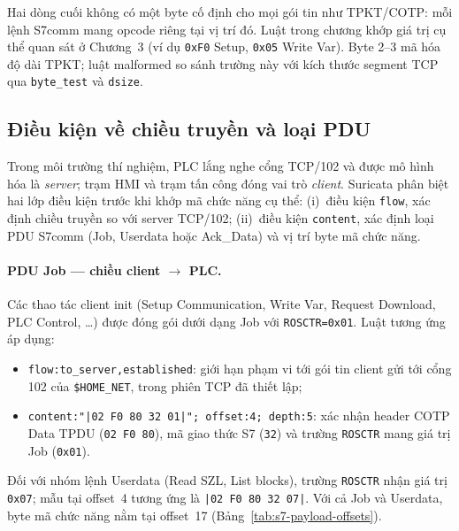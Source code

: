 \documentclass[../main.tex]{subfiles}
\begin{document}
Hai dòng cuối không có một byte cố định cho mọi gói tin như TPKT/COTP: mỗi lệnh S7comm mang opcode riêng tại vị trí đó. Luật trong chương khớp giá trị cụ thể quan sát ở Chương~3 (ví dụ \texttt{0xF0} Setup, \texttt{0x05} Write Var). Byte 2--3 mã hóa độ dài TPKT; luật malformed so sánh trường này với kích thước segment TCP qua \texttt{byte\_test} và \texttt{dsize}.

\subsection{Điều kiện về chiều truyền và loại PDU}
\label{sec:rule-flow-pdu}

Trong môi trường thí nghiệm, PLC lắng nghe cổng TCP/102 và được mô hình hóa là \emph{server}; trạm HMI và trạm tấn công đóng vai trò \emph{client}. Suricata phân biệt hai lớp điều kiện trước khi khớp mã chức năng cụ thể: (i)~điều kiện \texttt{flow}, xác định chiều truyền so với server TCP/102; (ii)~điều kiện \texttt{content}, xác định loại PDU S7comm (Job, Userdata hoặc Ack\_Data) và vị trí byte mã chức năng.

\paragraph{PDU Job --- chiều client $\rightarrow$ PLC.}
Các thao tác client init (Setup Communication, Write Var, Request Download, PLC Control, \ldots) được đóng gói dưới dạng Job với \texttt{ROSCTR=0x01}. Luật tương ứng áp dụng:
\begin{itemize}
    \item \texttt{flow:to\_server,established}: giới hạn phạm vi tới gói tin client gửi tới cổng 102 của \texttt{\$HOME\_NET}, trong phiên TCP đã thiết lập;
    \item \texttt{content:"|02 F0 80 32 01|"; offset:4; depth:5}: xác nhận header COTP Data TPDU (\texttt{02 F0 80}), mã giao thức S7 (\texttt{32}) và trường \texttt{ROSCTR} mang giá trị Job (\texttt{0x01}).
\end{itemize}
Đối với nhóm lệnh Userdata (Read SZL, List blocks), trường \texttt{ROSCTR} nhận giá trị \texttt{0x07}; mẫu tại offset~4 tương ứng là \texttt{|02 F0 80 32 07|}. Với cả Job và Userdata, byte mã chức năng nằm tại offset~17 (Bảng~\ref{tab:s7-payload-offsets}).
\end{document}
